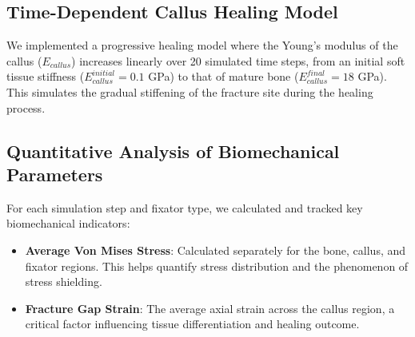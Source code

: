 \documentclass{article}
\begin{document}
\subsection{Time-Dependent Callus Healing Model}
We implemented a progressive healing model where the Young's modulus of the callus ($E_{callus}$) increases linearly over 20 simulated time steps, from an initial soft tissue stiffness ($E_{callus}^{initial} = 0.1$ GPa) to that of mature bone ($E_{callus}^{final} = 18$ GPa). This simulates the gradual stiffening of the fracture site during the healing process.

\subsection{Quantitative Analysis of Biomechanical Parameters}
For each simulation step and fixator type, we calculated and tracked key biomechanical indicators:
\begin{itemize}
  \item \textbf{Average Von Mises Stress}: Calculated separately for the bone, callus, and fixator regions. This helps quantify stress distribution and the phenomenon of stress shielding.
  \item \textbf{Fracture Gap Strain}: The average axial strain across the callus region, a critical factor influencing tissue differentiation and healing outcome.
\end{itemize}
\end{document}
